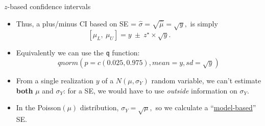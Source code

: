 \documentclass[10pt,handout]{beamer}\usepackage[]{graphicx}\usepackage[]{color}
\begin{document}
\begin{frame}{$z$-based confidence intervals}
	\begin{itemize}
		\setlength\itemsep{1.1em}
		\item Thus, a plus/minus CI based on SE = $\hat{\sigma} =  \sqrt{\hat{\mu}} = \sqrt{y},$   is simply
		$$[ \mu_{L}, \ \mu_{U}] = y  \ \pm \ z^\star \times \sqrt{y}. \ \ \ \ \ \ \ \ \ \ \ \  $$
		\item Equivalently we can use the \texttt{q} function: $$qnorm(p = c(0.025, 0.975), mean = y, sd = \sqrt{y})$$
		
		
		\vspace*{-0.7cm}
		
		\item From a single realization $y$ of a $N(\mu,\sigma_{Y})$ random variable, we can't estimate \textbf{both} $\mu$ and $\sigma_{Y}$: for a SE, we would have to use \textit{outside} information on $\sigma_{Y}$.  
		
		
		
		\item In the  Poisson$(\mu)$ distribution, $\sigma_{Y} = \sqrt{\mu},$ so we  calculate a ``\underline{model-based}'' SE.
		
		
	\end{itemize}
	
\end{frame}


\begin{frame}
\end{frame}
\end{document}
